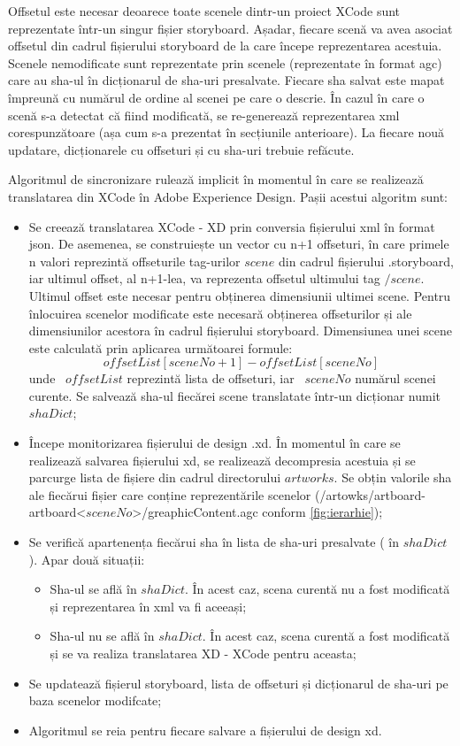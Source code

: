 Offsetul este necesar deoarece toate scenele dintr-un proiect XCode sunt reprezentate într-un singur fișier storyboard. Așadar, fiecare scenă va avea asociat offsetul din cadrul fișierului storyboard de la care începe reprezentarea acestuia. 
Scenele nemodificate sunt reprezentate prin scenele (reprezentate în format agc) care au sha-ul în dicționarul de sha-uri presalvate. Fiecare sha salvat este mapat împreună cu numărul de ordine al scenei pe care o descrie. 
În cazul în care o scenă s-a detectat că fiind modificată, se re-generează reprezentarea xml corespunzătoare (așa cum s-a prezentat în secțiunile anterioare).  La fiecare nouă updatare, dicționarele cu offseturi și cu sha-uri trebuie refăcute.

Algoritmul de sincronizare rulează implicit în momentul în care se realizează translatarea din XCode în Adobe Experience Design. Pașii acestui algoritm sunt:

\begin{itemize}  
\item Se creează translatarea XCode - XD prin conversia fișierului xml în format json. De asemenea, se construiește un vector cu n+1 offseturi, în care primele n valori reprezintă offseturile tag-urilor $scene$ din cadrul fișierului .storyboard, iar ultimul offset, al n+1-lea, va reprezenta offsetul ultimului tag $/scene$. Ultimul offset este necesar pentru obținerea dimensiunii ultimei scene. 
Pentru înlocuirea scenelor modificate este necesară obținerea offseturilor și ale dimensiunilor acestora în cadrul fișierului storyboard. Dimensiunea unei scene este calculată prin aplicarea următoarei formule:
\[offsetList[sceneNo + 1] - offsetList[sceneNo]\]
unde ~$offsetList$ reprezintă lista de offseturi, iar ~$sceneNo$ numărul scenei curente. Se salvează sha-ul fiecărei scene translatate într-un dicționar numit $shaDict$;

\item Începe monitorizarea fișierului de design .xd. În momentul în care se realizează salvarea fișierului xd, se realizează decompresia acestuia și se parcurge lista de fișiere din cadrul directorului $artworks$. Se obțin valorile sha ale fiecărui fișier care conține reprezentările scenelor (/artowks/artboard-artboard<$sceneNo$>/greaphicContent.agc conform \ref{fig:ierarhie}); 
\item Se verifică apartenența fiecărui sha în lista de sha-uri presalvate ( în $shaDict$). Apar două situații:
    \begin{itemize}  
    \item Sha-ul se află în $shaDict$. În acest caz, scena curentă nu a fost modificată și reprezentarea în xml va fi aceeași;
    \item Sha-ul nu se află în $shaDict$. În acest caz, scena curentă a fost modificată și se va realiza translatarea XD - XCode pentru aceasta;
    \end{itemize}
\item Se updatează fișierul storyboard, lista de offseturi și dicționarul de sha-uri pe baza scenelor modifcate;
\item Algoritmul se reia pentru fiecare salvare a fișierului de design xd.
\end{itemize}


